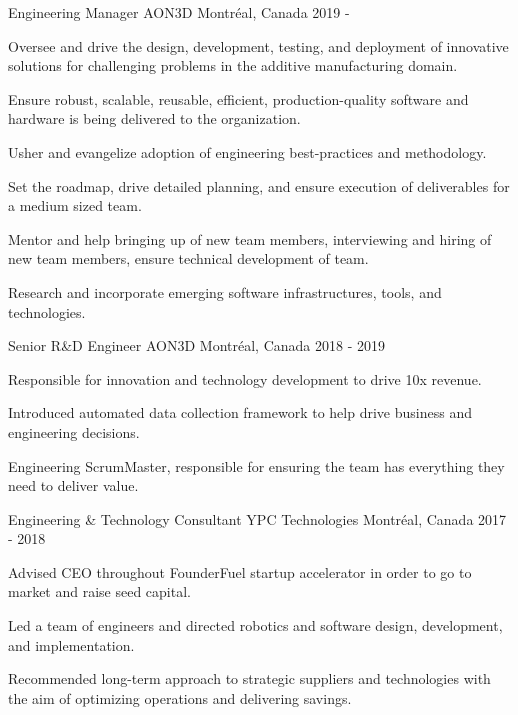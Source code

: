 \documentclass[11pt, letterpaper]{awesome-cv}
\begin{document}
\begin{cventries}

\cventry
{Engineering Manager}
{AON3D}
{Montréal, Canada}
{2019 - }
{
\begin{cvitems} 
\item{Oversee and drive the design, development, testing, and deployment of innovative solutions for challenging problems in the additive manufacturing domain.}
\item{Ensure robust, scalable, reusable, efficient, production-quality software and hardware is being delivered to the organization.}
\item{Usher and evangelize adoption of engineering best-practices and methodology.}
\item{Set the roadmap, drive detailed planning, and ensure execution of deliverables for a medium sized team.}
\item{Mentor and help bringing up of new team members, interviewing and hiring of new team members, ensure technical development of team.}
\item{Research and incorporate emerging software infrastructures, tools, and technologies.}
\end{cvitems}
}

\cventry
{Senior R\&D Engineer}
{AON3D}
{Montréal, Canada}
{2018 - 2019}
{
\begin{cvitems} 
\item{Responsible for innovation and technology development to drive 10x revenue.}
\item{Introduced automated data collection framework to help drive business and engineering decisions.}
\item{Engineering ScrumMaster, responsible for ensuring the team has everything they need to deliver value.}
\end{cvitems}
}

\cventry
{Engineering \& Technology Consultant}
{YPC Technologies}
{Montréal, Canada}
{2017 - 2018}
{
\begin{cvitems} 
\item{Advised CEO throughout FounderFuel startup accelerator in order to go to market and raise seed capital.}
\item{Led a team of engineers and directed robotics and software design, development, and implementation.}
\item{Recommended long-term approach to strategic suppliers and technologies with the aim of optimizing operations and delivering savings.}
\end{cvitems}
}


\end{cventries}
\end{document}
